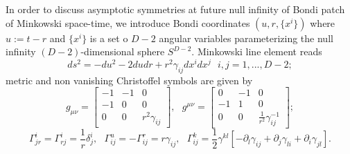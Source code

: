 \documentclass[a4paper,12pt]{article}
\begin{document}
In order to discuss asymptotic symmetries at future null infinity of Bondi patch of Minkowski space-time, we introduce Bondi coordinates $(u,r,\{x^i\})$ where $u:=t-r$ and $\{x^i\}$ is a set o $D-2$ angular variables parameterizing the null infinity $(D-2)$-dimensional sphere $S^{D-2}$. Minkowski line element reads
\begin{equation}
    ds^2=-du^2-2dudr+r^2\gamma_{ij}dx^idx^j \ \ \ i,j=1,...,D-2;
\end{equation}
metric and non vanishing Christoffel symbols are given by
\begin{equation}
   g_{\mu \nu} =\begin{bmatrix}
-1 &-1 & 0\\
-1 & 0 & 0\\
0 & 0 & r^2\gamma_{ij}
\end{bmatrix}, \ \ \ 
 g^{\mu \nu} =\begin{bmatrix}
0 & -1 & 0\\
-1 & 1 & 0\\
0 & 0 & \frac{1}{r^2}\gamma_{ij}^{-1}
\end{bmatrix};
\end{equation}
\begin{equation}
    \Gamma^i_{jr}=\Gamma^i_{rj}=\frac{1}{r}\delta^i_j, \ \ \ \Gamma^u_{ij}=-\Gamma^r_{ij}=r\gamma_{ij}, \ \ \ \Gamma^k_{ij}=\frac{1}{2}\gamma^{kl}[-\partial_l\gamma_{ij}+\partial_j\gamma_{li}+\partial_i\gamma_{jl}].
    \label{cribon}
\end{equation}

\end{document}

